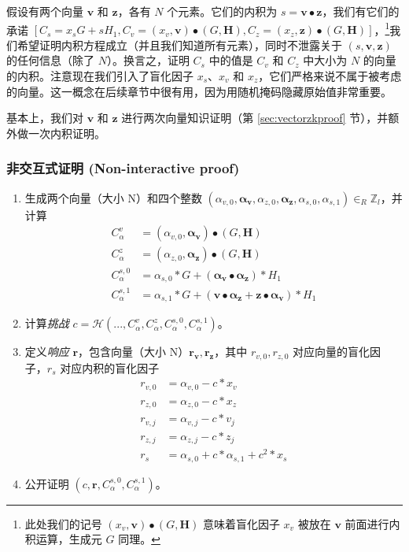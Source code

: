 假设有两个向量 $\boldsymbol{v}$ 和 $\boldsymbol{z}$，各有 $N$ 个元素。它们的内积为 $s = \boldsymbol{v} \bullet \boldsymbol{z}$，我们有它们的承诺 $[C_s = x_s G + s H_1, C_v = (x_v, \boldsymbol{v}) \bullet (G,\boldsymbol{H}), C_z = (x_z, \boldsymbol{z}) \bullet (G,\boldsymbol{H})]$，\footnote{此处我们的记号 $(x_v, \boldsymbol{v}) \bullet (G,\boldsymbol{H})$ 意味着盲化因子 $x_v$ 被放在 $\boldsymbol{v}$ 前面进行内积运算，生成元 $G$ 同理。}我们希望证明内积方程成立（并且我们知道所有元素），同时不泄露关于 $(s, \boldsymbol{v}, \boldsymbol{z})$ 的任何信息（除了 $N$）。换言之，证明 $C_s$ 中的值是 $C_v$ 和 $C_z$ 中大小为 $N$ 的向量的内积。注意现在我们引入了盲化因子 $x_s$、$x_v$ 和 $x_z$，它们严格来说不属于被考虑的向量。这一概念在后续章节中很有用，因为用随机掩码隐藏原始值非常重要。

基本上，我们对 $\boldsymbol{v}$ 和 $\boldsymbol{z}$ 进行两次向量知识证明（第 \ref{sec:vectorzkproof} 节），并额外做一次内积证明。


\subsubsection*{非交互式证明 (Non-interactive proof)}

\begin{enumerate}
	\item 生成两个向量（大小 N）和四个整数 \((\alpha_{v,0}, \boldsymbol{\alpha_v}, \alpha_{z,0}, \boldsymbol{\alpha_z}, \alpha_{s,0}, \alpha_{s,1}) \in_R \mathbb{Z}_l\)，并计算
	\begin{align*}
	C_{\alpha}^{v} &= (\alpha_{v,0},\boldsymbol{\alpha_v}) \bullet (G,\textbf{H}) \\
	C_{\alpha}^{z} &= (\alpha_{z,0}, \boldsymbol{\alpha_z}) \bullet (G,\textbf{H}) \\
	C_{\alpha}^{s,0} &= \alpha_{s,0}*G + (\boldsymbol{\alpha_v} \bullet \boldsymbol{\alpha_z})*H_1 \\
	C_{\alpha}^{s,1} &= \alpha_{s,1}*G + (\boldsymbol{v} \bullet \boldsymbol{\alpha_z} + \boldsymbol{z} \bullet \boldsymbol{\alpha_v})*H_1
	\end{align*}
	\item 计算{\em 挑战} $c = \mathcal{H}(...,C_{\alpha}^{v},C_{\alpha}^{z},C_{\alpha}^{s,0},C_{\alpha}^{s,1})$。
	\item 定义{\em 响应} $\boldsymbol{r}$，包含向量（大小 N）$\boldsymbol{r_v}, \boldsymbol{r_z}$，其中 $r_{v,0}, r_{z,0}$ 对应向量的盲化因子，$r_s$ 对应内积的盲化因子
	\begin{align*}
	r_{v,0} &= \alpha_{v,0} - c*x_v \\
	r_{z,0} &= \alpha_{z,0} - c*x_z \\
	r_{v,j} &= \alpha_{v,j} - c*v_j \\
	r_{z,j} &= \alpha_{z,j} - c*z_j \\
	r_s &= \alpha_{s,0} + c*\alpha_{s,1} + c^2*x_s 
	\end{align*}
	\item 公开证明 $(c, \boldsymbol{r}, C^{s,0}_{\alpha}, C^{s,1}_{\alpha})$。
\end{enumerate}

